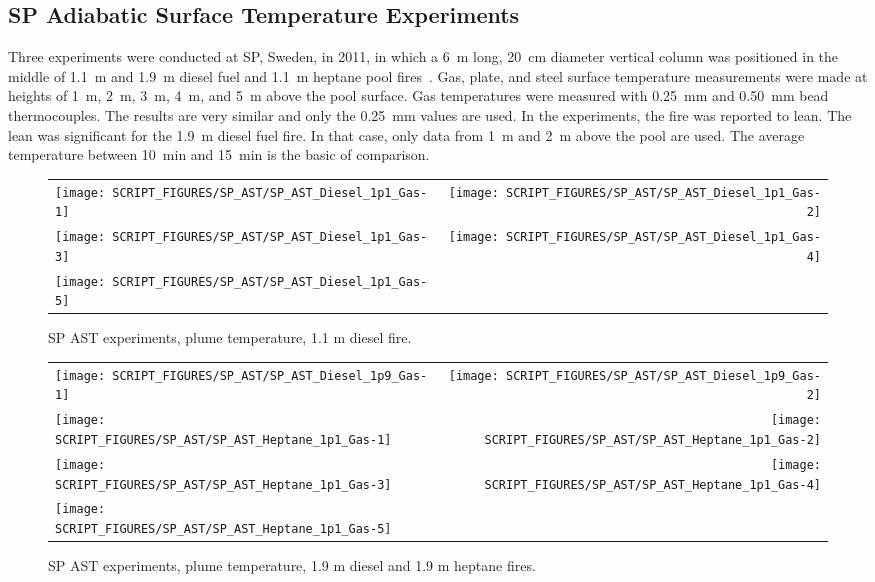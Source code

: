 \clearpage

\subsection{SP Adiabatic Surface Temperature Experiments}

Three experiments were conducted at SP, Sweden, in 2011, in which a 6~m long, 20~cm diameter vertical column was positioned in the middle of 1.1~m and 1.9~m diesel fuel and 1.1~m heptane
pool fires~\cite{Sjostrom:AST}. Gas, plate, and steel surface temperature measurements were made at heights of 1~m, 2~m, 3~m, 4~m, and 5~m above the pool surface. Gas temperatures were measured with 0.25~mm and 0.50~mm bead thermocouples. The results are very similar and only the 0.25~mm values are used. In the experiments, the fire was reported to lean. The lean was significant for the 1.9~m diesel fuel fire. In that case, only data from 1~m and 2~m above the pool are used. The average temperature between 10~min and 15~min is the basic of comparison.


\begin{figure}[!h]
\begin{tabular*}{\textwidth}{l@{\extracolsep{\fill}}r}
\texttt{[image: SCRIPT\_FIGURES/SP\_AST/SP\_AST\_Diesel\_1p1\_Gas-1]}   &  \texttt{[image: SCRIPT\_FIGURES/SP\_AST/SP\_AST\_Diesel\_1p1\_Gas-2]}    \\
\texttt{[image: SCRIPT\_FIGURES/SP\_AST/SP\_AST\_Diesel\_1p1\_Gas-3]}   &  \texttt{[image: SCRIPT\_FIGURES/SP\_AST/SP\_AST\_Diesel\_1p1\_Gas-4]}     \\
\texttt{[image: SCRIPT\_FIGURES/SP\_AST/SP\_AST\_Diesel\_1p1\_Gas-5]}   &
\end{tabular*}
\caption[SP AST experiments, plume temperature, 1.1 m diesel fire]
{SP AST experiments, plume temperature, 1.1 m diesel fire.}
\label{SP_Diesel_1p1_Gas}
\end{figure}

\newpage

\begin{figure}[p]
\begin{tabular*}{\textwidth}{l@{\extracolsep{\fill}}r}
\texttt{[image: SCRIPT\_FIGURES/SP\_AST/SP\_AST\_Diesel\_1p9\_Gas-1]}   &  \texttt{[image: SCRIPT\_FIGURES/SP\_AST/SP\_AST\_Diesel\_1p9\_Gas-2]}    \\
\texttt{[image: SCRIPT\_FIGURES/SP\_AST/SP\_AST\_Heptane\_1p1\_Gas-1]}  &  \texttt{[image: SCRIPT\_FIGURES/SP\_AST/SP\_AST\_Heptane\_1p1\_Gas-2]}    \\
\texttt{[image: SCRIPT\_FIGURES/SP\_AST/SP\_AST\_Heptane\_1p1\_Gas-3]}  &  \texttt{[image: SCRIPT\_FIGURES/SP\_AST/SP\_AST\_Heptane\_1p1\_Gas-4]}     \\
\texttt{[image: SCRIPT\_FIGURES/SP\_AST/SP\_AST\_Heptane\_1p1\_Gas-5]}  &
\end{tabular*}
\caption[SP AST experiments, plume temperature, 1.9 m diesel and 1.1 m heptane fires]
{SP AST experiments, plume temperature, 1.9 m diesel and 1.9 m heptane fires.}
\label{SP_Diesel_1p9_Gas}
\end{figure}

